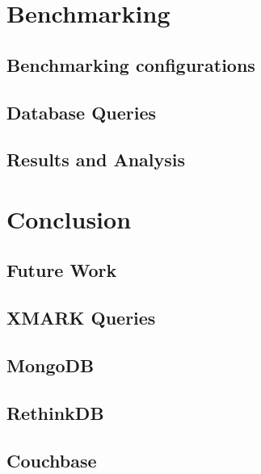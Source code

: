 \documentclass[a4paper,12pt]{book}
\begin{document}
	\chapter{Benchmarking}\label{ch:benchmarking} %
	\section{Benchmarking configurations}
	
    \section{Database Queries}
        
    \section{Results and Analysis}
        
	\chapter{Conclusion}\label{conc} 
	    
	\section{Future Work}\label{s.future}
	    
	\begin{appendices}
	   	\chapter{XMARK Queries}\label{appendices-queries}
		\section{MongoDB}\label{mongodb-query-list}
			
		\section{RethinkDB}\label{rethinkdb-query-list}
				
		\section{Couchbase}\label{couchbase-query-list}
				
								
	\end{appendices}
\end{document}
